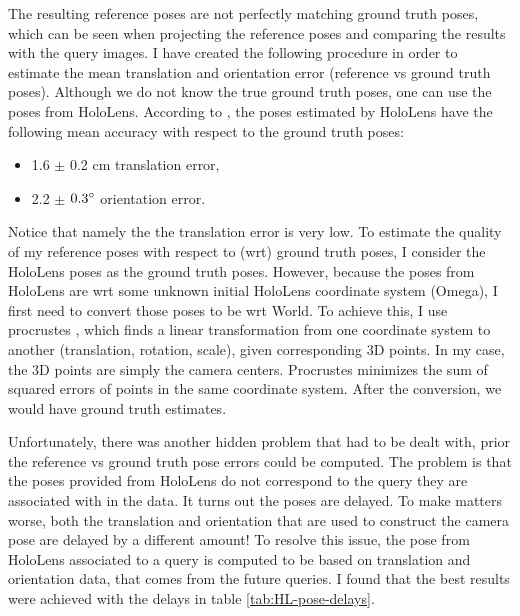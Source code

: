 \documentclass[twoside]{ctuthesis}
\theoremstyle{plain}
\theoremstyle{definition}
\theoremstyle{note}
\begin{document}
\label{paragraph:gt-vs-ref-poses}
The resulting reference poses are not perfectly matching ground truth poses, which can be seen when projecting the reference poses and comparing the results with the query images. I have created the following procedure in order to estimate the mean translation and orientation error (reference vs ground truth poses). Although we do not know the true ground truth poses, one can use the poses from HoloLens. According to \cite{HoloLensEvaluation}, the poses estimated by HoloLens have the following mean accuracy with respect to the ground truth poses:

\begin{itemize}
	\item 1.6 $\pm$ 0.2 cm translation error,
	\item 2.2 $\pm$ $0.3\degree$ orientation error.
\end{itemize}

Notice that namely the the translation error is very low. To estimate the quality of my reference poses with respect to (wrt) ground truth poses, I consider the HoloLens poses as the ground truth poses. However, because the poses from HoloLens are wrt some unknown initial HoloLens coordinate system (Omega), I first need to convert those poses to be wrt World. To achieve this, I use procrustes \cite{procrustes}, which finds a linear transformation from one coordinate system to another (translation, rotation, scale), given corresponding 3D points. In my case, the 3D points are simply the camera centers. Procrustes minimizes the sum of squared errors of points in the same coordinate system. After the conversion, we would have ground truth estimates.

Unfortunately, there was another hidden problem that had to be dealt with, prior the reference vs ground truth pose errors could be computed. The problem is that the poses provided from HoloLens do not correspond to the query they are associated with in the data. It turns out the poses are delayed. To make matters worse, both the translation and orientation that are used to construct the camera pose are delayed by a different amount! To resolve this issue, the pose from HoloLens associated to a query is computed to be based on translation and orientation data, that comes from the future queries. I found that the best results were achieved with the delays in table \ref{tab:HL-pose-delays}.
\end{document}
